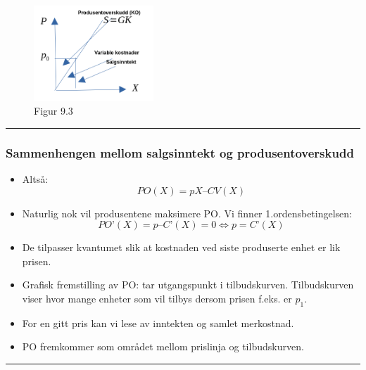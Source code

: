 \documentclass[
  letterpaper,
  DIV=11,
  numbers=noendperiod]{scrartcl}
\providecommand{\tightlist}{%
  \setlength{\itemsep}{0pt}\setlength{\parskip}{0pt}}\usepackage{longtable,booktabs,array}
\begin{document}
\begin{figure}[H]

{\centering \includegraphics[width=0.4\textwidth,height=\textheight]{drawio/prodo.png}

}

\caption{Figur 9.3}

\end{figure}%

\begin{center}\rule{0.5\linewidth}{0.5pt}\end{center}

\subsubsection{Sammenhengen mellom salgsinntekt og
produsentoverskudd}\label{sammenhengen-mellom-salgsinntekt-og-produsentoverskudd}

\begin{itemize}
\tightlist
\item
  Altså: \begin{equation*}
  PO(X) = pX – CV(X)
  \end{equation*}
\item
  Naturlig nok vil produsentene maksimere PO. Vi finner
  1.ordensbetingelsen: \begin{equation*}
  PO’(X) = p – C’(X) = 0 \Leftrightarrow p = C’(X)
  \end{equation*}
\item
  De tilpasser kvantumet slik at kostnaden ved siste produserte enhet er
  lik prisen.
\item
  Grafisk fremstilling av PO: tar utgangspunkt i tilbudskurven.
  Tilbudskurven viser hvor mange enheter som vil tilbys dersom prisen
  f.eks. er \(p_1\).
\item
  For en gitt pris kan vi lese av inntekten og samlet merkostnad.
\item
  PO fremkommer som området mellom prislinja og tilbudskurven.
\end{itemize}

\begin{center}\rule{0.5\linewidth}{0.5pt}\end{center}
\end{document}
